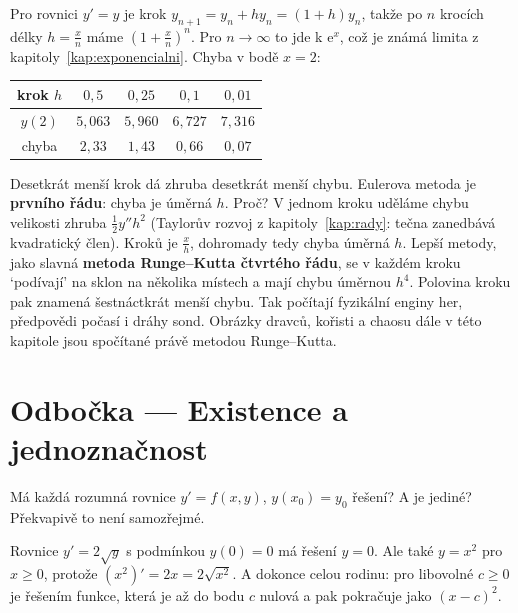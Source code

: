 Pro rovnici $y' = y$ je krok $y_{n+1} = y_n + hy_n = (1 + h)y_n$, takže po $n$ krocích délky $h = \frac{x}{n}$ máme ${\left(1 + \frac{x}{n}\right)}^n$. Pro $n\to\infty$ to jde k $\mathrm{e}^x$, což je známá limita z kapitoly~\ref{kap:exponencialni}. Chyba v bodě $x = 2$:

\begin{center}
  \begin{tabular}{c|cccc}
    krok $h$ & $0{,}5$ & $0{,}25$ & $0{,}1$ & $0{,}01$\\\hline
    $y(2)$ & $5{,}063$ & $5{,}960$ & $6{,}727$ & $7{,}316$\\
    chyba & $2{,}33$ & $1{,}43$ & $0{,}66$ & $0{,}07$
  \end{tabular}
\end{center}

Desetkrát menší krok dá zhruba desetkrát menší chybu. Eulerova metoda je \textbf{prvního řádu}: chyba je úměrná $h$. Proč? V jednom kroku uděláme chybu velikosti zhruba $\frac{1}{2}y''h^2$ (Taylorův rozvoj z kapitoly~\ref{kap:rady}: tečna zanedbává kvadratický člen). Kroků je $\frac{x}{h}$, dohromady tedy chyba úměrná $h$. Lepší metody, jako slavná \textbf{metoda Runge--Kutta čtvrtého řádu}, se v každém kroku `podívají' na sklon na několika místech a mají chybu úměrnou $h^4$. Polovina kroku pak znamená šestnáctkrát menší chybu. Tak počítají fyzikální enginy her, předpovědi počasí i dráhy sond. Obrázky dravců, kořisti a chaosu dále v této kapitole jsou spočítané právě metodou Runge--Kutta.

\section{Odbočka --- Existence a jednoznačnost}

Má každá rozumná rovnice $y' = f(x, y)$, $y(x_0) = y_0$ řešení? A je jediné? Překvapivě to není samozřejmé.

\begin{example}
  Rovnice $y' = 2\sqrt{y}$ s podmínkou $y(0) = 0$ má řešení $y = 0$. Ale také $y = x^2$ pro $x\geq 0$, protože $(x^2)' = 2x = 2\sqrt{x^2}$. A dokonce celou rodinu: pro libovolné $c\geq 0$ je řešením funkce, která je až do bodu $c$ nulová a pak pokračuje jako ${(x - c)}^2$.
\end{example}

\begin{center}
\end{center}


